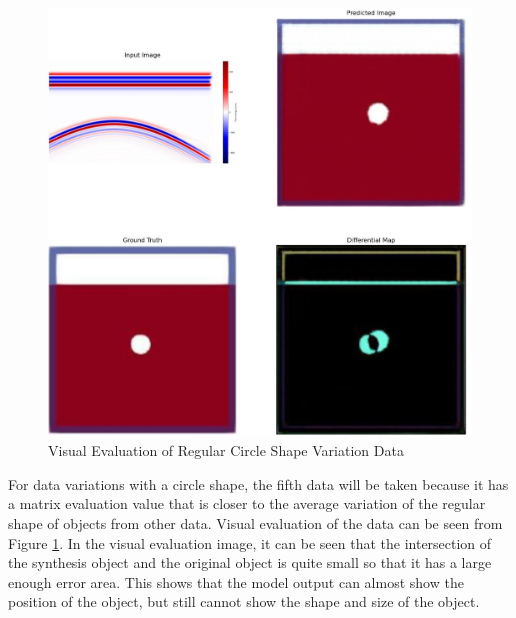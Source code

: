 \documentclass[conference]{IEEEtran}
\begin{document}
\begin{figure}[ht]
  \centering
  \includegraphics[scale=0.15]{gambar/diffMapLingkaran.jpg}
  \caption{Visual Evaluation of Regular Circle Shape Variation Data}
  \label{fig:diffmaplingkaran}
\end{figure}

For data variations with a circle shape, the fifth data will be taken because it has a matrix evaluation value that is closer to the average variation of the regular shape of objects from other data.
Visual evaluation of the data can be seen from Figure \ref{fig:diffmaplingkaran}.
In the visual evaluation image, it can be seen that the intersection of the synthesis object and the original object is quite small so that it has a large enough error area.
This shows that the model output can almost show the position of the object, but still cannot show the shape and size of the object.
\end{document}
